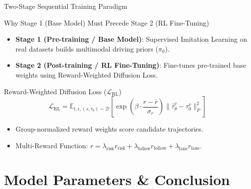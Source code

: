 \documentclass[t]{beamer}
\begin{document}
\begin{frame}{Two-Stage Sequential Training Paradigm}
    \begin{block}{Why Stage 1 (Base Model) Must Precede Stage 2 (RL Fine-Tuning)}
        \begin{itemize}
            \item \textbf{Stage 1 (Pre-training / Base Model)}: Supervised Imitation Learning on real datasets builds multimodal driving priors ($\pi_0$).
            \item \textbf{Stage 2 (Post-training / RL Fine-Tuning)}: Fine-tunes pre-trained base weights using Reward-Weighted Diffusion Loss.
        \end{itemize}
    \end{block}

    \begin{block}{Reward-Weighted Diffusion Loss ($\mathcal{L}_{\mathrm{RL}}$)}
        $$\mathcal{L}_{\mathrm{RL}} = \mathbb{E}_{t, \epsilon, (s, \tau_0) \sim \mathcal{D}} \left[ \exp\left(\beta \cdot \frac{r - \bar{r}}{\sigma_r}\right) \|\hat{\tau}_\theta^v - \tau_0^v\|_P^2 \right]$$
        \begin{itemize}
            \item Group-normalized reward weights score candidate trajectories.
            \item Multi-Reward Function: $r = \lambda_{\text{risk}} r_{\text{risk}} + \lambda_{\text{follow}} r_{\text{follow}} + \lambda_{\text{lane}} r_{\text{lane}}$.
        \end{itemize}
    \end{block}
\end{frame}

\section{Model Parameters \& Conclusion}
\end{document}
